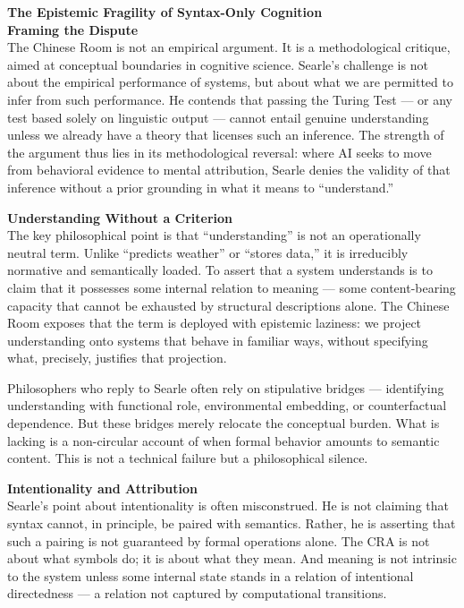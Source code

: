 \begin{technical}
{\Large\textbf{The Epistemic Fragility of Syntax-Only Cognition}}\\[0.7em]

\noindent\textbf{Framing the Dispute}\\[0.5em]
The Chinese Room is not an empirical argument. It is a methodological critique, aimed at conceptual boundaries in cognitive science. Searle's challenge is not about the empirical performance of systems, but about what we are permitted to infer from such performance. He contends that passing the Turing Test — or any test based solely on linguistic output — cannot entail genuine understanding unless we already have a theory that licenses such an inference. The strength of the argument thus lies in its methodological reversal: where AI seeks to move from behavioral evidence to mental attribution, Searle denies the validity of that inference without a prior grounding in what it means to “understand.”

\noindent\textbf{Understanding Without a Criterion}\\[0.5em]
The key philosophical point is that “understanding” is not an operationally neutral term. Unlike “predicts weather” or “stores data,” it is irreducibly normative and semantically loaded. To assert that a system understands is to claim that it possesses some internal relation to meaning — some content-bearing capacity that cannot be exhausted by structural descriptions alone. The Chinese Room exposes that the term is deployed with epistemic laziness: we project understanding onto systems that behave in familiar ways, without specifying what, precisely, justifies that projection.

Philosophers who reply to Searle often rely on stipulative bridges — identifying understanding with functional role, environmental embedding, or counterfactual dependence. But these bridges merely relocate the conceptual burden. What is lacking is a non-circular account of when formal behavior amounts to semantic content. This is not a technical failure but a philosophical silence.

\noindent\textbf{Intentionality and Attribution}\\[0.5em]
Searle’s point about intentionality is often misconstrued. He is not claiming that syntax cannot, in principle, be paired with semantics. Rather, he is asserting that such a pairing is not guaranteed by formal operations alone. The CRA is not about what symbols do; it is about what they mean. And meaning is not intrinsic to the system unless some internal state stands in a relation of intentional directedness — a relation not captured by computational transitions.


\end{technical}
